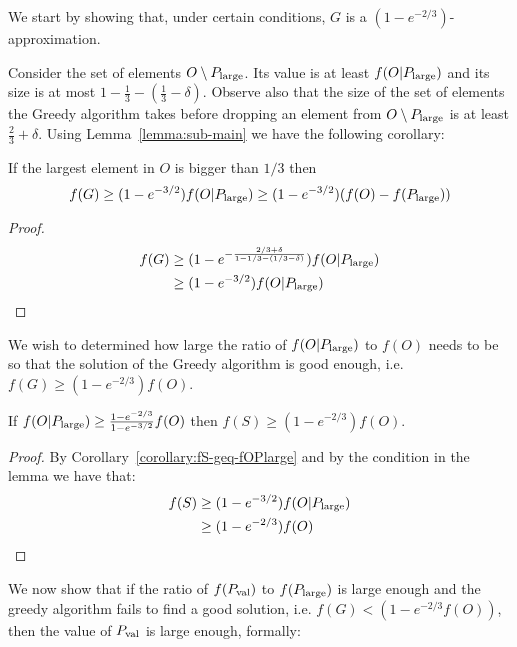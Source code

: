We start by showing that, under certain conditions, $G$ is a $(1 - e^{-2/3})$-approximation.

Consider the set of elements $O \setminus P_{\text{large}}$.
Its value is at least $f(O|P_{\text{large}})$ and its size is at most $1 - \frac{1}{3} - (\frac{1}{3} - \delta)$.
Observe also that the size of the set of elements the Greedy algorithm takes before dropping an element from $O \setminus P_{\text{large}}$ is at least $\frac{2}{3} + \delta$.
Using Lemma~\ref{lemma:sub-main} we have the following corollary:

\begin{corollary}
	\label{corollary:fS-geq-fOPlarge}
	If the largest element in $O$ is bigger than $1/3$ then
	\begin{equation}
		f(G)  \geq (1 - e^{-3/2})f(O|P_{\text{large}}) \geq (1 - e^{-3/2})(f(O) - f(P_{\text{large}}))
	\end{equation}
\end{corollary}

\begin{proof}
	\begin{align*}
		f(G) & \geq (1-e^{-\frac{2/3 + \delta}{1 - 1/3 - (1/3 - \delta)}})f(O|P_{\text{large}})
		\\ & \geq (1 - e^{-3/2})f(O|P_{\text{large}})
	\end{align*}
\end{proof}

We wish to determined how large the ratio of $f(O|P_{\text{large}})$ to $f(O)$ needs to be so that the solution of the Greedy algorithm is good enough, i.e. $f(G) \geq (1-e^{-2/3})f(O)$.

\begin{lemma}
	\label{lemma:greedy-good}
	If $f(O|P_{\text{large}}) \geq \frac{1-e^{-2/3}}{1-e^{-3/2}}f(O)$ then $f(S) \geq (1 - e^{-2/3})f(O)$.
\end{lemma}

\begin{proof}
	By Corollary~\ref{corollary:fS-geq-fOPlarge} and by the condition in the lemma we have that:
	\begin{align*}
		f(S)	& \geq (1 - e^{-3/2})f(O|P_{\text{large}})
		\\
				& \geq (1 - e^{-2/3})f(O)
	\end{align*}
\end{proof}

We now show that if the ratio of $f(P_{\text{val}})$ to $f(P_{\text{large}})$ is large enough and the greedy algorithm fails to find a good solution, i.e. $f(G) < (1 - e^{-2/3}f(O))$, then the value of $P_{\text{val}}$ is large enough, formally:

